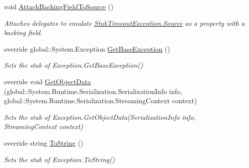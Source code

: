 \begin{DoxyCompactItemize}
void \hyperlink{class_system_1_1_fakes_1_1_stub_timeout_exception_a70bf86204fb5f20bf472904f0a37de8e}{Attach\-Backing\-Field\-To\-Source} ()
\begin{DoxyCompactList}\small\item\em Attaches delegates to emulate \hyperlink{class_system_1_1_fakes_1_1_stub_timeout_exception_a8b9095d52ea9db1395ad61cceadda02e}{Stub\-Timeout\-Exception.\-Source} as a property with a backing field.\end{DoxyCompactList}\item 
override global\-::\-System.\-Exception \hyperlink{class_system_1_1_fakes_1_1_stub_timeout_exception_ab03bddb55fd8192e9f034787ff265633}{Get\-Base\-Exception} ()
\begin{DoxyCompactList}\small\item\em Sets the stub of Exception.\-Get\-Base\-Exception()\end{DoxyCompactList}\item 
override void \hyperlink{class_system_1_1_fakes_1_1_stub_timeout_exception_a82663f6f30029ff9508d136101e57b49}{Get\-Object\-Data} (global\-::\-System.\-Runtime.\-Serialization.\-Serialization\-Info info, global\-::\-System.\-Runtime.\-Serialization.\-Streaming\-Context context)
\begin{DoxyCompactList}\small\item\em Sets the stub of Exception.\-Get\-Object\-Data(\-Serialization\-Info info, Streaming\-Context context)\end{DoxyCompactList}\item 
override string \hyperlink{class_system_1_1_fakes_1_1_stub_timeout_exception_adccea1026c8cc9f098e328708a304a19}{To\-String} ()
\begin{DoxyCompactList}\small\item\em Sets the stub of Exception.\-To\-String()\end{DoxyCompactList}\end{DoxyCompactItemize}
